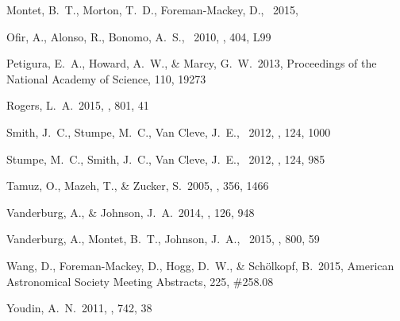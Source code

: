 \documentclass[12pt,preprint]{aastex}
\begin{document}
\begin{thebibliography}{}
Montet, B.~T., Morton, T.~D., Foreman-Mackey, D., \etal\ 2015,

Ofir, A., Alonso, R., Bonomo, A.~S., \etal\ 2010, \mnras, 404, L99

Petigura, E.~A., Howard, A.~W., \& Marcy, G.~W.\ 2013,
Proceedings of the National Academy of Science, 110, 19273

Rogers, L.~A.\ 2015, \apj, 801, 41

Smith, J.~C., Stumpe, M.~C., Van Cleve, J.~E., \etal\ 2012, \pasp, 124, 1000

Stumpe, M.~C., Smith, J.~C., Van Cleve, J.~E., \etal\ 2012, \pasp, 124, 985

Tamuz, O., Mazeh, T., \& Zucker, S.\ 2005, \mnras, 356, 1466

Vanderburg, A., \& Johnson, J.~A.\ 2014, \pasp, 126, 948

Vanderburg, A., Montet, B.~T., Johnson, J.~A., \etal\ 2015, \apj, 800, 59

Wang, D., Foreman-Mackey, D., Hogg, D.~W., \& Sch{\"o}lkopf, B.\ 2015,
American Astronomical Society Meeting Abstracts, 225, \#258.08

Youdin, A.~N.\ 2011, \apj, 742, 38

\end{thebibliography}
\end{document}
